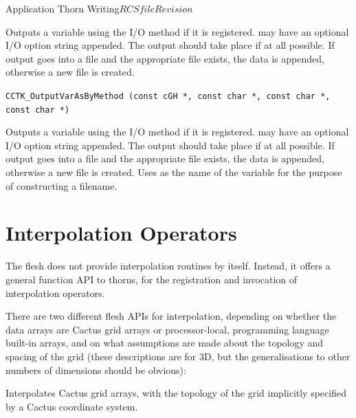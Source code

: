 \begin{cactuspart}{Application Thorn Writing}{$RCSfile$}{$Revision$}
\begin{description}
Outputs a variable  using the I/O method  if it is
registered.  may have an optional I/O option string appended.
The output should take place if at all possible.  If
output goes into a file and the appropriate file exists, the data is
appended, otherwise a new file is created.

\item \texttt{CCTK\_OutputVarAsByMethod (const cGH *,
                                     const char *,
                                     const char *,\\
                                     const char *)}

Outputs a variable  using the I/O method  if it is
registered.  may have an optional I/O option string appended.
The output should take place if at all possible.
If output goes into a file and the appropriate file exists, the data is
appended, otherwise a new file is created.  Uses  as the
name of the variable for the purpose of constructing a filename.

\end{description}


\section{Interpolation Operators}
\label{sec:inop}

The flesh does not provide interpolation routines by itself. Instead,
it offers a general function API to thorns, for the registration and
invocation of interpolation operators.

There are two different flesh APIs for interpolation, depending
on whether the data arrays are Cactus grid arrays or processor-local,
programming language built-in arrays, and on what assumptions
are made about the topology and spacing of the grid (these descriptions
are for 3D, but the generalisations to other numbers of dimensions
should be obvious):
\begin{Lentry}
\item[\texttt{CCTK\_InterpGridArrays()}]
        Interpolates Cactus grid arrays, with the topology of the
        grid implicitly specified by a Cactus coordinate system.


\end{Lentry}
\end{cactuspart}
